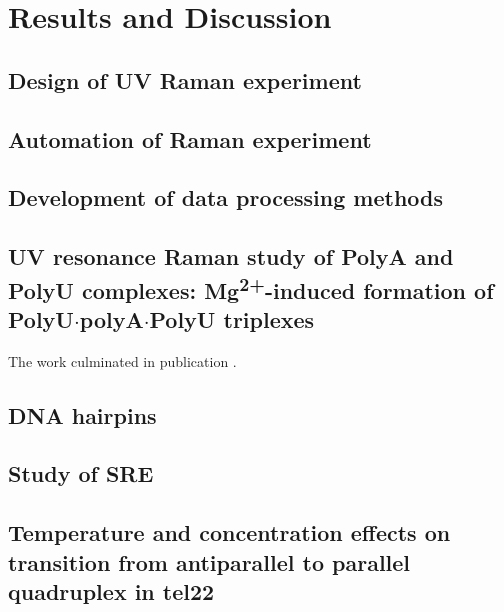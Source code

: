 \chapter{Results and Discussion}

\section{Design of UV Raman experiment}



\section{Automation of Raman experiment}

\section{Development of data processing methods}

\section[\texorpdfstring{%
    UV resonance Raman study of PolyA and PolyU complexes:\\
		Mg\textsuperscript{2+}\babelhyphen{nobreak}induced formation of
		PolyU$\cdot$polyA$\cdot$PolyU triplexes
}{%
    UV resonance Raman study of PolyA and PolyU complexes:
		Mg\texttwosuperior\textplussuperior-induced formation of PolyU·polyA·PolyU
		triplexes
}]{%
    UV resonance Raman study of PolyA and PolyU complexes:
		Mg\textsuperscript{2+}-induced formation of PolyU$\cdot$polyA$\cdot$PolyU
		triplexes
}%

The work culminated in publication \textcite{Klener2015}.

\section{DNA hairpins}

\section{Study of SRE}

\section[Temperature and concentration effects on transition from antiparallel to parallel quadruplex in tel22]{Temperature and concentration effects on transition from antiparallel to parallel\\ quadruplex in tel22}
